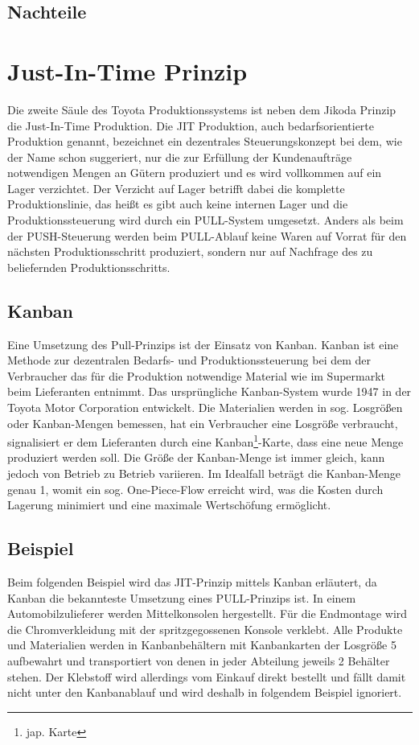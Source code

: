 \documentclass[00_ToyotaProduktionssystem.tex]{subfiles}
\begin{document}
\subsection{Nachteile}

\section{Just-In-Time Prinzip}
Die zweite Säule des Toyota Produktionssystems ist neben dem Jikoda Prinzip die Just-In-Time Produktion. Die JIT Produktion, auch bedarfsorientierte Produktion genannt, bezeichnet ein dezentrales Steuerungskonzept bei dem,  wie der Name schon suggeriert, nur die zur Erfüllung der Kundenaufträge notwendigen Mengen an Gütern produziert und es wird vollkommen auf ein Lager verzichtet. Der Verzicht auf Lager betrifft dabei die komplette Produktionslinie, das heißt es gibt auch keine internen Lager und die Produktionssteuerung wird durch ein PULL-System umgesetzt. Anders als beim der PUSH-Steuerung werden beim PULL-Ablauf keine Waren auf Vorrat für den nächsten Produktionsschritt produziert, sondern nur auf Nachfrage des zu beliefernden Produktionsschritts.

\subsection{Kanban}
Eine Umsetzung des Pull-Prinzips ist der Einsatz von Kanban. Kanban ist eine Methode zur dezentralen Bedarfs- und Produktionssteuerung bei dem der Verbraucher das für die Produktion notwendige Material wie im Supermarkt beim Lieferanten entnimmt. Das ursprüngliche Kanban-System wurde 1947 in der Toyota Motor Corporation entwickelt. Die Materialien werden in sog. Losgrößen oder Kanban-Mengen bemessen, hat ein Verbraucher eine Losgröße verbraucht, signalisiert er dem Lieferanten durch eine Kanban\footnote{jap. Karte}-Karte, dass eine neue Menge produziert werden soll. Die Größe der Kanban-Menge ist immer gleich, kann jedoch von Betrieb zu Betrieb variieren. Im Idealfall beträgt die Kanban-Menge genau 1, womit ein sog. One-Piece-Flow erreicht wird, was die Kosten durch Lagerung minimiert und eine maximale Wertschöfung ermöglicht.

\subsection{Beispiel}
Beim folgenden Beispiel wird das JIT-Prinzip mittels Kanban erläutert, da Kanban die bekannteste Umsetzung eines PULL-Prinzips ist.
In einem Automobilzulieferer werden Mittelkonsolen hergestellt. Für die Endmontage wird die Chromverkleidung mit der spritzgegossenen Konsole verklebt. Alle Produkte und Materialien werden in Kanbanbehältern mit Kanbankarten der Losgröße 5 aufbewahrt und transportiert von denen in jeder Abteilung jeweils 2 Behälter stehen. Der Klebstoff wird allerdings vom Einkauf direkt bestellt und fällt damit nicht unter den Kanbanablauf und wird deshalb in folgendem Beispiel ignoriert.
\end{document}
